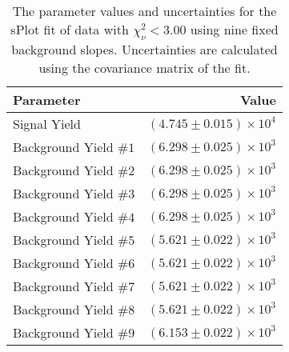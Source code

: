 
\begin{table}[ht]
    \begin{center}
        \begin{tabular}{lr}\toprule
            Parameter & Value \\\midrule
            Signal Yield & $(4.745 \pm 0.015) \times 10^{4}$ \\
            Background Yield $\#1$ & $(6.298 \pm 0.025) \times 10^{3}$ \\
            Background Yield $\#2$ & $(6.298 \pm 0.025) \times 10^{3}$ \\
            Background Yield $\#3$ & $(6.298 \pm 0.025) \times 10^{3}$ \\
            Background Yield $\#4$ & $(6.298 \pm 0.025) \times 10^{3}$ \\
            Background Yield $\#5$ & $(5.621 \pm 0.022) \times 10^{3}$ \\
            Background Yield $\#6$ & $(5.621 \pm 0.022) \times 10^{3}$ \\
            Background Yield $\#7$ & $(5.621 \pm 0.022) \times 10^{3}$ \\
            Background Yield $\#8$ & $(5.621 \pm 0.022) \times 10^{3}$ \\
            Background Yield $\#9$ & $(6.153 \pm 0.022) \times 10^{3}$ \\\bottomrule
        \end{tabular}
        \caption{The parameter values and uncertainties for the sPlot fit of data with $\chi^2_\nu < 3.00$ using nine fixed background slopes. Uncertainties are calculated using the covariance matrix of the fit.}\label{tab:splot-fit-results-chisqdof-3.00-fixed-9}
    \end{center}
\end{table}

